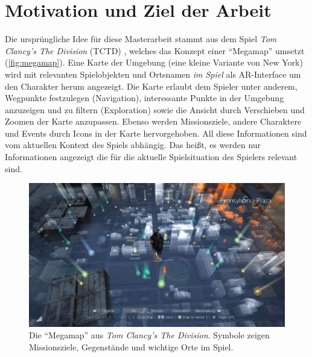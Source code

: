 \section{Motivation und Ziel der Arbeit}
\label{sec:motivation_ziel}
Die ursprüngliche Idee für diese Masterarbeit stammt aus dem Spiel \emph{Tom Clancy's The Division} (TCTD) \parencite{Ubisoft2018}, welches das Konzept einer \enquote{Megamap} umsetzt (\autoref{fig:megamap}).
Eine Karte der Umgebung (eine kleine Variante von New York) wird mit relevanten Spielobjekten und Ortsnamen \emph{im Spiel} als AR-Interface um den Charakter herum angezeigt.
Die Karte erlaubt dem Spieler unter anderem, Wegpunkte festzulegen (Navigation), interessante Punkte in der Umgebung anzuzeigen und zu filtern (Exploration) sowie die Ansicht durch Verschieben und Zoomen der Karte anzupassen.
Ebenso werden Missionsziele, andere Charaktere und Events durch Icons in der Karte hervorgehoben.
All diese Informationen sind vom aktuellen Kontext des Spiels abhängig.
Das heißt, es werden nur Informationen angezeigt die für die aktuelle Spielsituation des Spielers relevant sind.
\begin{figure}[t]
    \centering
    \includegraphics[width=\textwidth]{figures/the_division_megamap.jpg}
    \caption{Die \enquote{Megamap} aus \emph{Tom Clancy's The Division}. Symbole zeigen Missionsziele, Gegenstände und wichtige Orte im Spiel.}
    \label{fig:megamap}
\end{figure}

